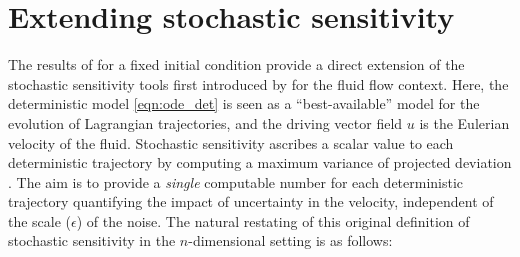 \section{Extending stochastic sensitivity}\label{sec:theory_s2}
The results of  for a fixed initial condition provide a direct extension of the stochastic sensitivity tools first introduced by \citet{Balasuriya_2020_StochasticSensitivityComputable} for the fluid flow context.
Here, the deterministic model \cref{eqn:ode_det} is seen as a ``best-available'' model for the evolution of Lagrangian trajectories, and the driving vector field \(u\) is the Eulerian velocity of the fluid.
Stochastic sensitivity ascribes a scalar value to each deterministic trajectory by computing a maximum variance of projected deviation \citep{Balasuriya_2020_StochasticSensitivityComputable}.
The aim is to provide a \emph{single} computable number for each deterministic trajectory quantifying the impact of uncertainty in the velocity, independent of the scale (\(\epsilon\)) of the noise.
The natural restating of this original definition of stochastic sensitivity \citep{Balasuriya_2020_StochasticSensitivityComputable} in the $ n $-dimensional setting is as follows:

